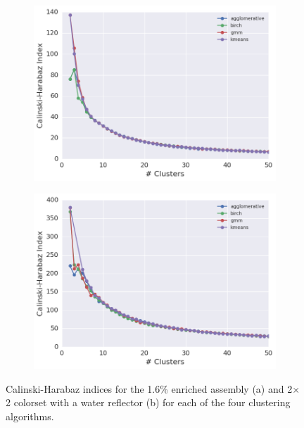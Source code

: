 \begin{figure}[h!]
\centering
\begin{subfigure}{\textwidth}
  \centering
  \includegraphics[width=0.9\linewidth]{figures/results/model-select/assm-16/ch-combined-U238-capture-1}
  \caption{}
  \label{fig:chap11-assm-16-ch-index}
\end{subfigure}
\begin{subfigure}{\textwidth}
  \centering
  \includegraphics[width=0.9\linewidth]{figures/results/model-select/reflector/ch-combined-U238-nu-fission-1}
  \caption{}
\label{fig:chap11-refl-ch-index}
\end{subfigure}
\caption[Calinski-Harabaz index variation with the number of clusters]{Calinski-Harabaz indices for the 1.6\% enriched assembly (a) and 2$\times$2 colorset with a water reflector (b) for each of the four clustering algorithms.}
\label{fig:chap11-ch-indices}
\end{figure}


